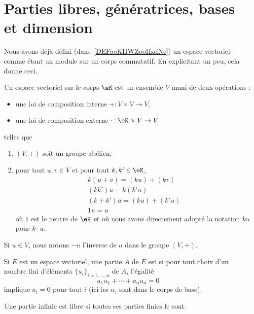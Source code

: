 
\section{Parties libres, génératrices, bases et dimension}

Nous avons déjà défini (dans~\ref{DEFooKHWZooIfxdNc}) un espace vectoriel comme étant un module sur un corps commutatif. En explicitant un peu, cela donne ceci\cite{ooQLVLooEUrNLS}.

Un espace vectoriel sur le corps \( \eK\) est un ensemble \( V\) muni de deux opérations :
\begin{itemize}
    \item une loi de composition interne \( +\colon V\times V\to V\),
    \item une loi de composition externe \( \cdot\colon \eK\times V\to V\)
\end{itemize}
telles que
\begin{enumerate}
    \item
        \( (V,+)\) soit un groupe abélien,
    \item
        pour tout \( u,v\in V\) et pour tout \( k,k'\in \eK\),
        \begin{subequations}
           \begin{align}
                k(u+v)=(ku)+(kv)\\
                (kk')u=k(k'u)\\
                (k+k')u=(ku)+(k'u)\\
                1u=u
            \end{align}
        \end{subequations}
        où \( 1\) est le neutre de \( \eK\) et où nous avons directement adopté la notation \( ku\) pour \( k\cdot u\).
\end{enumerate}
Si \( u\in V\), nous notons \( -u\) l'inverse de \( u\) dans le groupe \( (V,+)\).

\begin{definition}
    Si \( E\) est un espace vectoriel, une partie \( A\) de \( E\) est  si pour tout choix d'un nombre fini d'éléments \( \{ u_i \}_{i=1,\ldots, n}\) de \( A\), l'égalité
    \begin{equation}
        a_1 u_1+\cdots +a_nu_n=0
    \end{equation}
    implique \( a_i=0\) pour tout \( i\) (ici les \( a_i\) sont dans le corps de base).

    Une partie infinie est libre si toutes ses parties finies le sont.
\end{definition}

